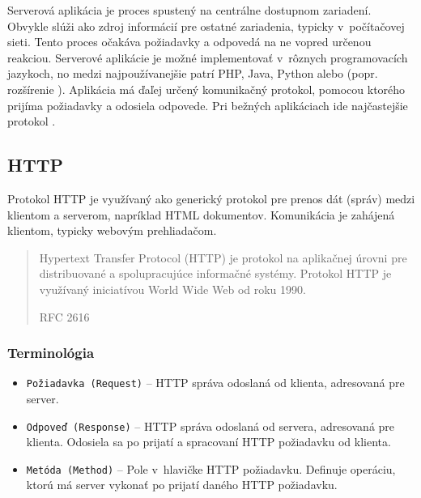 \noindent Serverová aplikácia je proces spustený na centrálne dostupnom zariadení. Obvykle slúži ako zdroj informácií pre ostatné zariadenia, typicky v~počítačovej sieti. Tento proces očakáva požiadavky a odpovedá na ne vopred určenou reakciou. Serverové aplikácie je možné implementovať v~rôznych programovacích jazykoch, no medzi najpoužívanejšie patrí PHP, Java, Python alebo  (popr. rozšírenie ). Aplikácia má ďaľej určený komunikačný protokol, pomocou ktorého prijíma požiadavky a odosiela odpovede. Pri bežných aplikáciach ide najčastejšie protokol .

\subsection{HTTP}
\label{subsection:http}
Protokol HTTP je využívaný ako generický protokol pre prenos dát (správ) medzi klientom a serverom, napríklad HTML dokumentov. Komunikácia je zahájená klientom, typicky webovým prehliadačom. \\

\blockquote[RFC 2616 \cite{RFC_HTTP}]{Hypertext Transfer Protocol (HTTP) je protokol na aplikačnej úrovni pre distribuované a spolupracujúce informačné systémy. Protokol HTTP je využívaný iniciatívou World Wide Web od roku 1990.}
 
\subsubsection{Terminológia}

\begin{itemize}
	\item \texttt{Požiadavka (Request)} -- HTTP správa odoslaná od klienta, adresovaná pre server.
	\item \texttt{Odpoveď (Response)} -- HTTP správa odoslaná od servera, adresovaná pre klienta. Odosiela sa po prijatí a spracovaní HTTP požiadavku od klienta.
	\item \texttt{Metóda (Method)} -- Pole v~hlavičke HTTP požiadavku. Definuje operáciu, ktorú má server vykonať po prijatí daného HTTP požiadavku.
\end{itemize}

